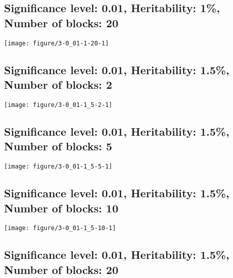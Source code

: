 \documentclass[11pt,letter]{article}\usepackage[]{graphicx}\usepackage[]{color}
\makeatletter
\def\maxwidth{ %
  \ifdim\Gin@nat@width>\linewidth
    \linewidth
  \else
    \Gin@nat@width
  \fi
}
\newenvironment{knitrout}{}{} %
\makeatother
\begin{document}
\newpage
\subsection{Significance level: 0.01, Heritability: 1\%, Number of blocks: 20}

\begin{knitrout}
\color{fgcolor}
\texttt{[image: figure/3-0\_01-1-20-1]} 

\end{knitrout}

\newpage
\subsection{Significance level: 0.01, Heritability: 1.5\%, Number of blocks: 2}

\begin{knitrout}
\color{fgcolor}
\texttt{[image: figure/3-0\_01-1\_5-2-1]} 

\end{knitrout}

\newpage
\subsection{Significance level: 0.01, Heritability: 1.5\%, Number of blocks: 5}

\begin{knitrout}
\color{fgcolor}
\texttt{[image: figure/3-0\_01-1\_5-5-1]} 

\end{knitrout}

\newpage
\subsection{Significance level: 0.01, Heritability: 1.5\%, Number of blocks: 10}

\begin{knitrout}
\color{fgcolor}
\texttt{[image: figure/3-0\_01-1\_5-10-1]} 

\end{knitrout}

\newpage
\subsection{Significance level: 0.01, Heritability: 1.5\%, Number of blocks: 20}
\end{document}

